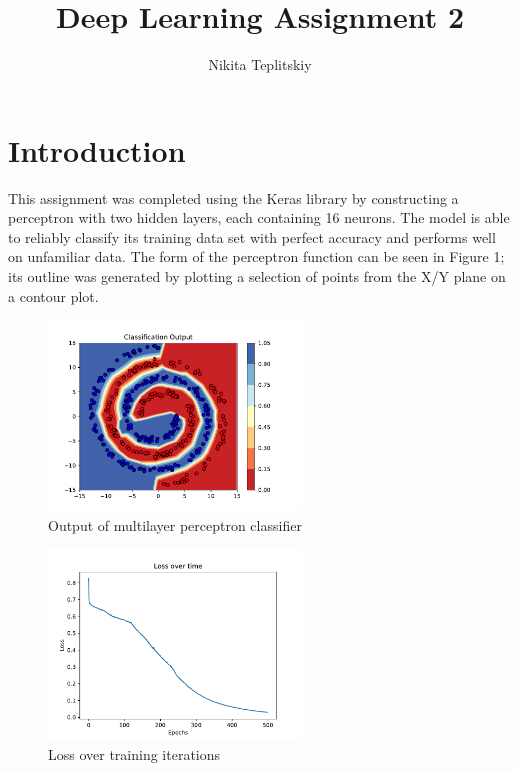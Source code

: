 \documentclass[twocolumn]{article}
\title{Deep Learning Assignment 2}
\author{Nikita Teplitskiy}
\begin{document}
\maketitle
\section{Introduction}
This assignment was completed using the Keras library by constructing a perceptron with two hidden layers, each containing 16 neurons. The model is able to reliably classify its training data set with perfect accuracy and performs well on unfamiliar data. The form of the perceptron function can be seen in Figure 1; its outline was generated by plotting a selection of points from the X/Y plane on a contour plot.

\begin{figure}[H]
    \centering
    \hspace*{-1cm}    
    \includegraphics[width=0.6\textwidth]{result.pdf}
    \caption{Output of multilayer perceptron classifier}
\end{figure}

\begin{figure}[H]
    \centering
    \includegraphics[width=0.6\textwidth]{loss.pdf}
    \caption{Loss over training iterations}
\end{figure}
\end{document}
